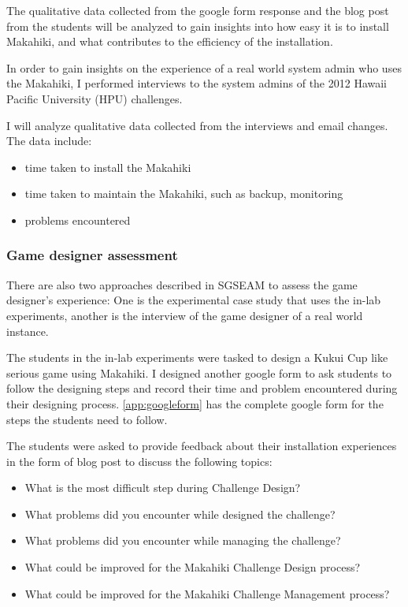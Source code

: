 The qualitative data collected from the google form response and the blog post from the students will be analyzed to gain insights into how easy it is to install Makahiki, and what contributes to the efficiency of the installation.

In order to gain insights on the experience of a real world system admin who uses the Makahiki, I performed interviews to the system admins of the 2012 Hawaii Pacific University (HPU) challenges.

I will analyze qualitative data collected from the interviews and email changes. The data include:
\begin{itemize}
 \item time taken to install the Makahiki
 \item time taken to maintain the Makahiki, such as backup, monitoring
 \item problems encountered
\end{itemize}

\subsubsection{Game designer assessment}

There are also two approaches described in SGSEAM to assess the game designer's experience: One is the experimental case study that uses the in-lab experiments, another is the interview of the game designer of a real world instance.

The students in the in-lab experiments were tasked to design a Kukui Cup like serious game using Makahiki. I designed another google form to ask students to follow the designing steps and record their time and problem encountered during their designing process. \autoref{app:googleform} has the complete google form for the steps the students need to follow.

The students were asked to provide feedback about their installation experiences in the form of blog post to discuss the following topics:
\begin{itemize}
\item What is the most difficult step during Challenge Design?
\item What problems did you encounter while designed the challenge?
\item What problems did you encounter while managing the challenge?
\item What could be improved for the Makahiki Challenge Design process?
\item What could be improved for the Makahiki Challenge Management process?
\end{itemize}


